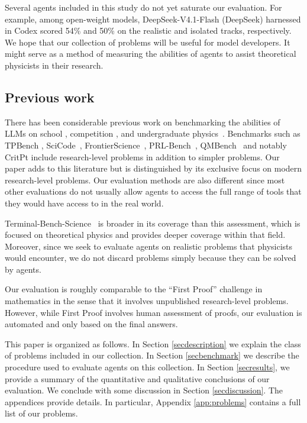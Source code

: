\documentclass[aps,prd,reprint,superscriptaddress,nofootinbib]{revtex4-2}
\begin{document}
Several agents included in this study do not yet saturate our evaluation. For example, among open-weight models, DeepSeek-V4.1-Flash (DeepSeek) harnessed in Codex scored 54\% and 50\% on the realistic and isolated tracks, respectively. We hope that our collection of problems will be useful for model developers. It might serve as a method of measuring the abilities of agents to assist theoretical physicists in their research. 


\subsection{Previous work}
There has been considerable previous work on benchmarking the abilities of LLMs on school \cite{ding2023physqa,qiu2025phybench}, competition \cite{he2024olympiadbench,yu2025hipho}, and undergraduate physics~\cite{xu2025ugphysics}. Benchmarks such as TPBench \cite{chung2025tpbench}, SciCode~\cite{tian2024scicode}, FrontierScience~\cite{wang2026frontierscience}, PRL-Bench~\cite{miao2026prlbench}, QMBench~\cite{wang2025qmbench} and notably CritPt \cite{zhu2025probing} include research-level problems in addition to simpler problems.  Our paper adds to this literature but is distinguished by its exclusive focus on modern research-level problems. Our evaluation methods are also different since most other evaluations do not usually allow agents to access the full range of tools that they would have access to in the real world. 

Terminal-Bench-Science~\cite{terminalbenchscience2026} is broader in its coverage than this assessment, which is focused on theoretical physics and provides deeper coverage within that field. Moreover, since we seek to evaluate agents on realistic problems that physicists would encounter,  we do not discard problems simply because they can be solved by agents.

Our evaluation is roughly comparable to the ``First Proof'' challenge in mathematics \cite{abouzaid2026first,abouzaid2026firstproofsolutions,abouzaid2026firstsecond,feng2026aletheiafirstproof}  in the sense that it involves unpublished research-level problems. However, while First Proof involves human assessment of proofs, our evaluation is automated and only based on the final answers.



This paper is organized as follows. In Section \ref{secdescription} we explain the class of problems included in our collection. In Section \ref{secbenchmark} we describe the procedure used to evaluate agents on this collection. In Section \ref{secresults}, we provide a summary of the quantitative and qualitative conclusions of our evaluation. We conclude with some discussion in Section \ref{secdiscussion}. The appendices provide details. In particular, Appendix \ref{app:problems} contains a full list of our problems.
\end{document}
